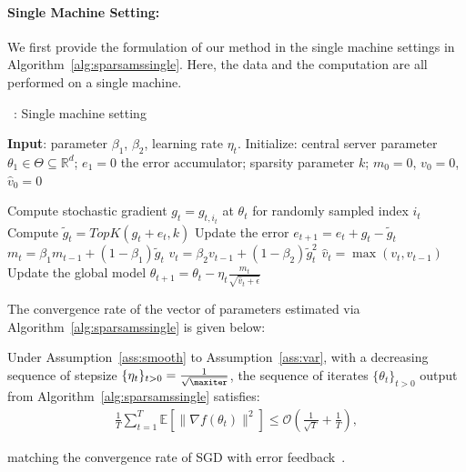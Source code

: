 \documentclass[11pt]{article}
\begin{document}
\paragraph{Single Machine Setting:}

We first provide the formulation of our method in the single machine settings in Algorithm~\ref{alg:sparsamssingle}.
Here, the data and the computation are all performed on a single machine.

\begin{algorithm}[H]
\caption{\algo\ : Single machine setting} \label{alg:sparsamssingle}
\begin{algorithmic}[1]

\STATE \textbf{Input}: parameter $\beta_1$, $\beta_2$, learning rate $\eta_t$. 
\STATE Initialize: central server parameter $\theta_{1} \in \Theta \subseteq \mathbb R^d$; $e_{1}=0$ the error accumulator; sparsity parameter $k$; $m_0=0$, $v_0=0$, $\hat v_0=0$

\STATE  Compute stochastic gradient $g_{t} = g_{t,i_t}$ at $\theta_t$ for randomly sampled index $i_t$\label{line:stochgrad} 
\STATE  Compute $\tilde g_{t}=TopK(g_{t}+e_{t},k)$ \label{line:topksingle} 
\STATE  Update the error $e_{t+1}=e_{t}+g_{t}-\tilde g_{t}$
\STATE $m_t=\beta_1 m_{t-1}+(1-\beta_1)\tilde g_t$
\STATE $v_t=\beta_2 v_{t-1}+(1-\beta_2)\tilde g_t^2$
\STATE $\hat v_t=\max(v_t,\hat v_{t-1})$ \label{line:vsingle}
\STATE Update the global model $\theta_{t+1}=\theta_{t}-\eta_t\frac{m_t}{\sqrt{\hat v_t+\epsilon}}$

\ENDFOR
\end{algorithmic}
\end{algorithm}


The convergence rate of the vector of parameters estimated via Algorithm~\ref{alg:sparsamssingle} is given below:
\begin{Theorem}\label{thm:mainsingle}
Under Assumption~\ref{ass:smooth} to Assumption~\ref{ass:var}, with a decreasing sequence of stepsize $\{\eta_t\}_{t>0} = \frac{1}{\sqrt{\maxiter}}$, the sequence of iterates $\{\theta_t\}_{t>0}$ output from Algorithm~\ref{alg:sparsamssingle} satisfies:
\begin{align*}
    \frac{1}{T}\sum_{t=1}^T \mathbb E[\|\nabla f(\theta_t)\|^2]\leq \mathcal O(\frac{1}{\sqrt T}+\frac{1}{T}),
\end{align*}

\end{Theorem}

matching the convergence rate of SGD with error feedback~\cite{karimireddy2019error}.
\end{document}
